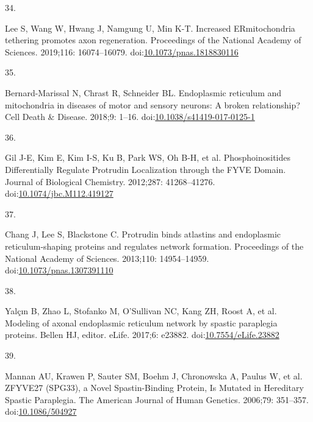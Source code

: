\documentclass[
  12pt,
  a4paper,
]{article}
\newlength{\cslhangindent}
\newlength{\csllabelwidth}
\newlength{\cslentryspacingunit} %
\newenvironment{CSLReferences}[2] %
 {%
  \setlength{\parindent}{0pt}
  \ifodd #1
  \let\oldpar\par
  \def\par{\hangindent=\cslhangindent\oldpar}
  \fi
  \setlength{\parskip}{#2\cslentryspacingunit}
 }%
 {}
\newcommand{\CSLLeftMargin}[1]{\parbox[t]{\csllabelwidth}{#1}}
\newcommand{\CSLRightInline}[1]{\parbox[t]{\linewidth - \csllabelwidth}{#1}\break}
\begin{document}
\begin{CSLReferences}{0}{0}
\leavevmode{}%
\CSLLeftMargin{34. }%
\CSLRightInline{Lee S, Wang W, Hwang J, Namgung U, Min K-T. Increased
{ER}\textendash mitochondria tethering promotes axon regeneration.
Proceedings of the National Academy of Sciences. 2019;116: 16074--16079.
doi:\href{https://doi.org/10.1073/pnas.1818830116}{10.1073/pnas.1818830116}}

\leavevmode{}%
\CSLLeftMargin{35. }%
\CSLRightInline{Bernard-Marissal N, Chrast R, Schneider BL. Endoplasmic
reticulum and mitochondria in diseases of motor and sensory neurons: A
broken relationship? Cell Death \& Disease. 2018;9: 1--16.
doi:\href{https://doi.org/10.1038/s41419-017-0125-1}{10.1038/s41419-017-0125-1}}

\leavevmode{}%
\CSLLeftMargin{36. }%
\CSLRightInline{Gil J-E, Kim E, Kim I-S, Ku B, Park WS, Oh B-H, et al.
Phosphoinositides {Differentially Regulate Protrudin Localization}
through the {FYVE Domain}. Journal of Biological Chemistry. 2012;287:
41268--41276.
doi:\href{https://doi.org/10.1074/jbc.M112.419127}{10.1074/jbc.M112.419127}}

\leavevmode{}%
\CSLLeftMargin{37. }%
\CSLRightInline{Chang J, Lee S, Blackstone C. Protrudin binds atlastins
and endoplasmic reticulum-shaping proteins and regulates network
formation. Proceedings of the National Academy of Sciences. 2013;110:
14954--14959.
doi:\href{https://doi.org/10.1073/pnas.1307391110}{10.1073/pnas.1307391110}}

\leavevmode{}%
\CSLLeftMargin{38. }%
\CSLRightInline{Yalçın B, Zhao L, Stofanko M, O'Sullivan NC, Kang ZH,
Roost A, et al. Modeling of axonal endoplasmic reticulum network by
spastic paraplegia proteins. Bellen HJ, editor. eLife. 2017;6: e23882.
doi:\href{https://doi.org/10.7554/eLife.23882}{10.7554/eLife.23882}}

\leavevmode{}%
\CSLLeftMargin{39. }%
\CSLRightInline{Mannan AU, Krawen P, Sauter SM, Boehm J, Chronowska A,
Paulus W, et al. {ZFYVE27} ({SPG33}), a {Novel Spastin-Binding Protein},
{Is Mutated} in {Hereditary Spastic Paraplegia}. The American Journal of
Human Genetics. 2006;79: 351--357.
doi:\href{https://doi.org/10.1086/504927}{10.1086/504927}}


\end{CSLReferences}
\end{document}
